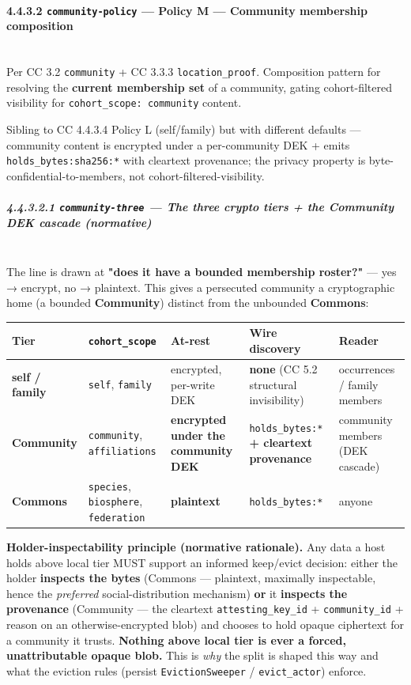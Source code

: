 \documentclass[11pt]{article}
\begin{document}
\paragraph{4.4.3.2 \texttt{community-policy} — Policy M — Community membership composition}\mbox{}\\


Per CC 3.2 \texttt{community} + CC 3.3.3 \texttt{location\_proof}. Composition pattern for resolving the \textbf{current membership set} of a community, gating cohort-filtered visibility for \texttt{cohort\_scope: community} content.


Sibling to CC 4.4.3.4 Policy L (self/family) but with different defaults — community content is encrypted under a per-community DEK + emits \texttt{holds\_bytes:sha256:*} with cleartext provenance; the privacy property is byte-confidential-to-members, not cohort-filtered-visibility.


\subparagraph{4.4.3.2.1 \texttt{community-three} — The three crypto tiers + the Community DEK cascade (normative)}\mbox{}\\


The line is drawn at \textbf{"does it have a bounded membership roster?"} — yes → encrypt, no → plaintext. This gives a persecuted community a cryptographic home (a bounded \textbf{Community}) distinct from the unbounded \textbf{Commons}:


{\scriptsize
\begin{longtable}{|p{3.2cm}|p{3.2cm}|p{3.2cm}|p{3.2cm}|p{3.2cm}|}\hline
\textbf{Tier} & \textbf{\texttt{cohort\_scope}} & \textbf{At-rest} & \textbf{Wire discovery} & \textbf{Reader} \\ \hline\endhead
\textbf{self / family} & \texttt{self}, \texttt{family} & encrypted, per-write DEK & \textbf{none} (CC 5.2 structural invisibility) & occurrences / family members \\ \hline
\textbf{Community} & \texttt{community}, \texttt{affiliations} & \textbf{encrypted under the community DEK} & \texttt{holds\_bytes:*} \textbf{+ cleartext provenance} & community members (DEK cascade) \\ \hline
\textbf{Commons} & \texttt{species}, \texttt{biosphere}, \texttt{federation} & \textbf{plaintext} & \texttt{holds\_bytes:*} & anyone \\ \hline
\end{longtable}}



\textbf{Holder-inspectability principle (normative rationale).} Any data a host holds above local tier MUST support an informed keep/evict decision: either the holder \textbf{inspects the bytes} (Commons — plaintext, maximally inspectable, hence the \textit{preferred} social-distribution mechanism) \textbf{or} it \textbf{inspects the provenance} (Community — the cleartext \texttt{attesting\_key\_id} + \texttt{community\_id} + reason on an otherwise-encrypted blob) and chooses to hold opaque ciphertext for a community it trusts. \textbf{Nothing above local tier is ever a forced, unattributable opaque blob.} This is \textit{why} the split is shaped this way and what the eviction rules (persist \texttt{EvictionSweeper} / \texttt{evict\_actor}) enforce.
\end{document}
